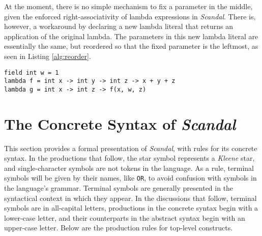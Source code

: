 At the moment, there is no simple mechanism to fix a parameter in the middle, given the enforced right-associativity of lambda expressions in \emph{Scandal}. There is, however, a workaround by declaring a new lambda literal that returns an application of the original lambda. The parameters in this new lambda literal are essentially the same, but reordered so that the fixed parameter is the leftmost, as seen in Listing \ref{alg:reorder}.

\begin{lstlisting}[emph={field,int,lambda,print},emphstyle={\textbf},caption={Right associativity of lambda expressions.},label={alg:reorder}]
field int w = 1
lambda f = int x -> int y -> int z -> x + y + z
lambda g = int x -> int z -> f(x, w, z)
\end{lstlisting}

\section{The Concrete Syntax of \emph{Scandal}}

This section provides a formal presentation of \emph{Scandal}, with rules for its concrete syntax. In the productions that follow, the star symbol represents a \emph{Kleene} star, and single-character symbols are not tokens in the language. As a rule, terminal symbols will be given by their names, like \texttt{OR}, to avoid confusion with symbols in the language's grammar. Terminal symbols are generally presented in the syntactical context in which they appear. In the discussions that follow, terminal symbols are in all-capital letters, productions in the concrete syntax begin with a lower-case letter, and their counterparts in the abstract syntax begin with an upper-case letter. Below are the production rules for top-level constructs.

